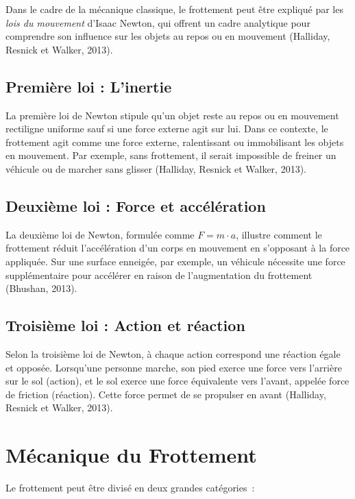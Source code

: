 Dans le cadre de la mécanique classique, le frottement peut être expliqué par les \textit{lois du mouvement} d’Isaac Newton, qui offrent un cadre analytique pour comprendre son influence sur les objets au repos ou en mouvement (Halliday, Resnick et Walker, 2013).


\subsection*{Première loi : L'inertie}

La première loi de Newton stipule qu’un objet reste au repos ou en mouvement rectiligne uniforme sauf si une force externe agit sur lui. Dans ce contexte, le frottement agit comme une force externe, ralentissant ou immobilisant les objets en mouvement. Par exemple, sans frottement, il serait impossible de freiner un véhicule ou de marcher sans glisser (Halliday, Resnick et Walker, 2013).

\subsection*{Deuxième loi : Force et accélération}

La deuxième loi de Newton, formulée comme \( F = m \cdot a \), illustre comment le frottement réduit l’accélération d’un corps en mouvement en s’opposant à la force appliquée. Sur une surface enneigée, par exemple, un véhicule nécessite une force supplémentaire pour accélérer en raison de l’augmentation du frottement (Bhushan, 2013).

\subsection*{Troisième loi : Action et réaction}

Selon la troisième loi de Newton, à chaque action correspond une réaction égale et opposée. Lorsqu’une personne marche, son pied exerce une force vers l’arrière sur le sol (action), et le sol exerce une force équivalente vers l’avant, appelée force de friction (réaction). Cette force permet de se propulser en avant (Halliday, Resnick et Walker, 2013).

\section*{Mécanique du Frottement}

Le frottement peut être divisé en deux grandes catégories :

